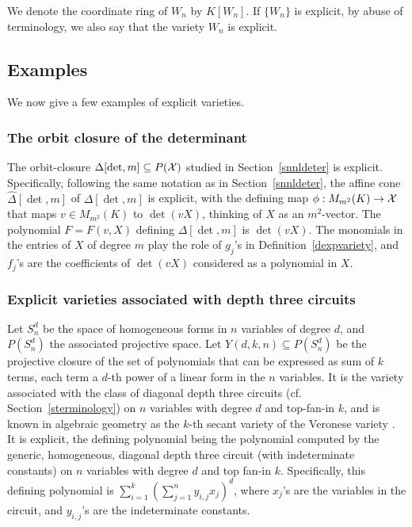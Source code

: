 \documentclass[11pt]{article}
\begin{document}
We denote the coordinate ring of $W_n$ by $K[W_n]$.
If $\{W_n\}$ is explicit, by abuse of terminology, we also say that the variety $W_n$ is explicit.

\subsection{Examples} \label{sexample}
We now give a few examples of explicit varieties.

\subsubsection{The orbit closure of the determinant} \label{sorbitclosuredet}
The orbit-closure $\Delta[\det,m] \subseteq P({\cal X})$ studied in Section~\ref{snnldeter} is explicit. Specifically, 
following the same notation as in Section~\ref{snnldeter}, 
the affine cone $\hat \Delta[\det,m]$ of  $\Delta[\det,m]$ is explicit, with the defining
map $\phi: M_{m^2}(K) \rightarrow {\cal X}$ that maps $v \in M_{m^2}(K)$ to 
$\det(v X)$, thinking of $X$ as an $m^2$-vector. 
The polynomial $F=F(v,X)$ defining $\Delta[\det,m]$  is  $\det(v X)$.
The monomials in the entries of $X$ of degree $m$ play the role of $g_j$'s  in Definition~\ref{dexpvariety}, and
$f_j$'s are the coefficients of  $\det(v X)$ considered 
as a polynomial in $X$.

\subsubsection{Explicit varieties associated with depth three  circuits} \label{lexporbitclosuresthree}
Let $S^d_n$ be the space of  homogeneous forms in $n$ variables of degree $d$, and $P(S^d_n)$ the associated projective space.
Let $Y(d,k,n) \subseteq P(S^d_n)$ be
the projective closure of the set of polynomials that can be expressed as sum of $k$ terms, each term a  $d$-th power of a  linear form in 
the $n$ variables. 
It is the  variety associated with the class of diagonal 
depth three circuits (cf. Section~\ref{sterminology}) on $n$ variables with degree $d$ and top-fan-in $k$, and
is known in algebraic geometry as the $k$-th secant variety of the Veronese  variety  \cite{landsberg}. 
It is explicit, the defining polynomial being the polynomial computed by the generic,
homogeneous,  diagonal depth three circuit (with 
indeterminate constants) on
$n$ variables with degree $d$ and top fan-in $k$. Specifically, this defining polynomial
is $\sum_{i=1}^k (\sum_{j=1}^n y_{i,j} x_j)^d$, where $x_j$'s are the variables in the 
circuit, and  $y_{i,j}$'s are the indeterminate constants. 
\end{document}
